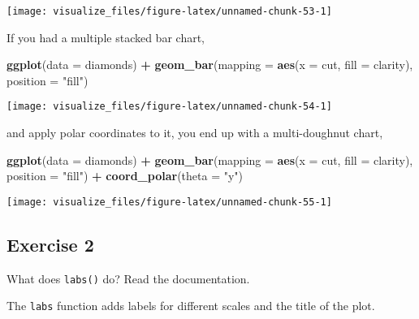 \documentclass[]{book}
\newenvironment{Shaded}{\begin{snugshade}}{\end{snugshade}}
\newcommand{\DataTypeTok}[1]{\textcolor[rgb]{0.13,0.29,0.53}{#1}}
\newcommand{\KeywordTok}[1]{\textcolor[rgb]{0.13,0.29,0.53}{\textbf{#1}}}
\newcommand{\NormalTok}[1]{#1}
\newcommand{\OperatorTok}[1]{\textcolor[rgb]{0.81,0.36,0.00}{\textbf{#1}}}
\newcommand{\StringTok}[1]{\textcolor[rgb]{0.31,0.60,0.02}{#1}}
\theoremstyle{plain}
\theoremstyle{remark}
\theoremstyle{definition}
\theoremstyle{definition}
\theoremstyle{definition}
\theoremstyle{remark}
\begin{document}
\begin{center}\texttt{[image: visualize\_files/figure-latex/unnamed-chunk-53-1]} \end{center}

If you had a multiple stacked bar chart,

\begin{Shaded}
\begin{Highlighting}[]
\KeywordTok{ggplot}\NormalTok{(}\DataTypeTok{data =}\NormalTok{ diamonds) }\OperatorTok{+}
\StringTok{  }\KeywordTok{geom_bar}\NormalTok{(}\DataTypeTok{mapping =} \KeywordTok{aes}\NormalTok{(}\DataTypeTok{x =}\NormalTok{ cut, }\DataTypeTok{fill =}\NormalTok{ clarity), }\DataTypeTok{position =} \StringTok{"fill"}\NormalTok{)}
\end{Highlighting}
\end{Shaded}

\begin{center}\texttt{[image: visualize\_files/figure-latex/unnamed-chunk-54-1]} \end{center}

and apply polar coordinates to it, you end up with a multi-doughnut
chart,

\begin{Shaded}
\begin{Highlighting}[]
\KeywordTok{ggplot}\NormalTok{(}\DataTypeTok{data =}\NormalTok{ diamonds) }\OperatorTok{+}
\StringTok{  }\KeywordTok{geom_bar}\NormalTok{(}\DataTypeTok{mapping =} \KeywordTok{aes}\NormalTok{(}\DataTypeTok{x =}\NormalTok{ cut, }\DataTypeTok{fill =}\NormalTok{ clarity), }\DataTypeTok{position =} \StringTok{"fill"}\NormalTok{) }\OperatorTok{+}
\StringTok{  }\KeywordTok{coord_polar}\NormalTok{(}\DataTypeTok{theta =} \StringTok{"y"}\NormalTok{)}
\end{Highlighting}
\end{Shaded}

\begin{center}\texttt{[image: visualize\_files/figure-latex/unnamed-chunk-55-1]} \end{center}

\hypertarget{exercise-2-3}{%
\subsection{Exercise 2}\label{exercise-2-3}}

What does \texttt{labs()} do? Read the documentation.

The \texttt{labs} function adds labels for different scales and the
title of the plot.
\end{document}

